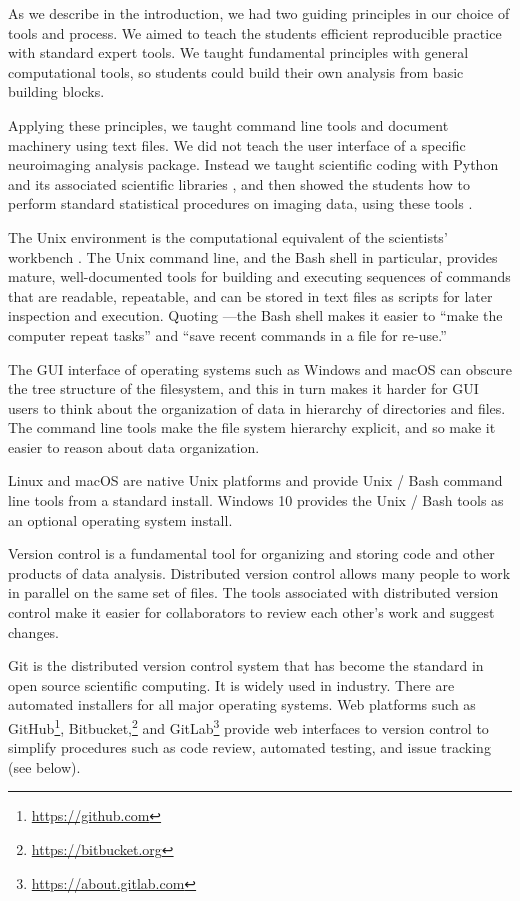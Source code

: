 As we describe in the introduction, we had two guiding principles in our
choice of tools and process.  We aimed to teach the students efficient
reproducible practice with standard expert tools.  We taught fundamental
principles with general computational tools, so students could build their own
analysis from basic building blocks.

Applying these principles, we taught command line tools and document machinery
using text files.  We did not teach the user interface of a specific
neuroimaging analysis package. Instead we taught scientific coding with Python
and its associated scientific libraries \citep{millman2011python,
perez2011python}, and then showed the students how to perform standard
statistical procedures on imaging data, using these tools
\citep{millman2007analysis}.

The Unix environment is the computational equivalent of the scientists'
workbench \citep{preeyanon2014reproducible}.  The Unix command line, and the
Bash shell in particular, provides mature, well-documented tools for building
and executing sequences of commands that are readable, repeatable, and can be
stored in text files as scripts for later inspection and execution.  Quoting
\cite{wilson2014best}---the Bash shell makes it easier to ``make the computer
repeat tasks'' and ``save recent commands in a file for re-use.''

The GUI interface of operating systems such as Windows and macOS can obscure
the tree structure of the filesystem, and this in turn makes it harder for GUI
users to think about the organization of data in hierarchy of directories and
files.  The command line tools make the file system hierarchy explicit, and so
make it easier to reason about data organization.

Linux and macOS are native Unix platforms and provide Unix / Bash command line
tools from a standard install.  Windows 10 provides the Unix / Bash tools as
an optional operating system install.

Version control is a fundamental tool for organizing and storing code and
other products of data analysis.
Distributed version control allows many people to work in parallel on the
same set of files.
The tools associated with distributed version control make it easier for
collaborators to review each other's work and suggest changes.

Git is the distributed version control system that has become the standard in
open source scientific computing. It is widely used in industry.
There are automated installers for all major operating systems.
Web platforms such as GitHub\footnote{\url{https://github.com}},
Bitbucket,\footnote{\url{https://bitbucket.org}} and
GitLab\footnote{\url{https://about.gitlab.com}} provide web interfaces to
version control to simplify procedures such as code review, automated testing,
and issue tracking (see below).

